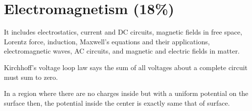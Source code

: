 
\section{Electromagnetism (18\%)}

It includes electrostatics, current and DC circuits, magnetic fields in free space, Lorentz force, induction, Maxwell's equations and their applications, electromagnetic waves, AC circuits, and magnetic and electric fields in matter.


Kirchhoff's voltage loop law says the sum of all voltages about a complete circuit must sum to zero.

In a region where there are no charges inside but with a uniform potential on the surface then, the potential inside the center is exactly same that of surface.